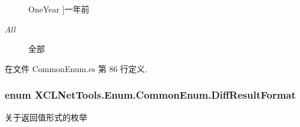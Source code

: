 \begin{Desc}
\begin{description}
{One\+Year\hypertarget{class_x_c_l_net_tools_1_1_enum_1_1_common_enum_abac0e863746b7fb8e6364c17f61648eaae0e2407272c8d5ee6e131146067c7055}{}\label{class_x_c_l_net_tools_1_1_enum_1_1_common_enum_abac0e863746b7fb8e6364c17f61648eaae0e2407272c8d5ee6e131146067c7055}
}]一年前 \item[{\em 
All\hypertarget{class_x_c_l_net_tools_1_1_enum_1_1_common_enum_abac0e863746b7fb8e6364c17f61648eaab1c94ca2fbc3e78fc30069c8d0f01680}{}\label{class_x_c_l_net_tools_1_1_enum_1_1_common_enum_abac0e863746b7fb8e6364c17f61648eaab1c94ca2fbc3e78fc30069c8d0f01680}
}]全部 \end{description}
\end{Desc}


在文件 Common\+Enum.\+cs 第 86 行定义.

\subsubsection[{\texorpdfstring{Diff\+Result\+Format}{DiffResultFormat}}]{\setlength{\rightskip}{0pt plus 5cm}enum {\bf X\+C\+L\+Net\+Tools.\+Enum.\+Common\+Enum.\+Diff\+Result\+Format}\hspace{0.3cm}{\ttfamily [strong]}}\hypertarget{class_x_c_l_net_tools_1_1_enum_1_1_common_enum_aaefa466811a65c8971576fcdb80354a4}{}\label{class_x_c_l_net_tools_1_1_enum_1_1_common_enum_aaefa466811a65c8971576fcdb80354a4}


关于返回值形式的枚举 

